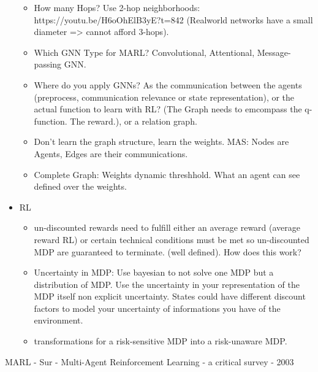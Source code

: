 \begin{itemize}[noitemsep,nolistsep]
	\begin{itemize}[noitemsep,nolistsep]
		\item How many Hops? Use 2-hop neighborhoods: https://youtu.be/H6oOhElB3yE?t=842 (Realworld networks have a small diameter => cannot afford 3-hops).
		\item Which GNN Type for MARL? Convolutional, Attentional, Message-passing GNN.
		\item Where do you apply GNNs? As the communication between the agents (preprocess, communication relevance or state representation), or the actual function to learn with RL? (The Graph needs to emcompass the q-function. The reward.), or a relation graph. 
		\item Don't learn the graph structure, learn the weights. MAS: Nodes are Agents, Edges are their communications.
		\item Complete Graph: Weights dynamic threshhold. What an agent can see defined over the weights.
	\end{itemize}
	\item RL
	\begin{itemize}[noitemsep,nolistsep]
		\item un-discounted rewards need to fulfill either an average reward (average reward RL) or certain technical conditions must be met so un-discounted MDP are guaranteed to terminate. (well defined). How does this work?
		\item Uncertainty in MDP: Use bayesian to not solve one MDP but a distribution of MDP. Use the uncertainty in your representation of the MDP itself non explicit uncertainty. States could have different discount factors to model your uncertainty of informations you have of the environment.
		\item transformations for a risk-sensitive MDP into a risk-unaware MDP.
	\end{itemize}
\end{itemize}


MARL - Sur - Multi-Agent Reinforcement Learning - a critical survey - 2003
